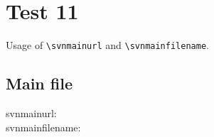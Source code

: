 \documentclass[12pt]{report}
\begin{document}
\chapter{Test 11}
Usage of \verb+\svnmainurl+ and \verb+\svnmainfilename+.\\

\section{Main file}

\noindent
svnmainurl: \svnnolinkurl{\svnmainurl} \\
svnmainfilename: \svnnolinkurl{\svnmainfilename} \\


\end{document}
